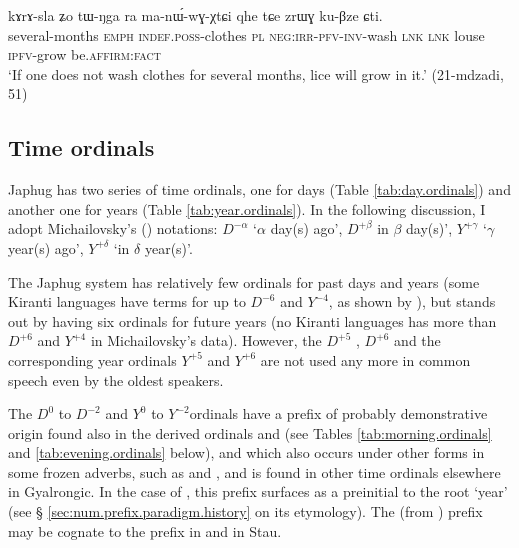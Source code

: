 \begin{exe}
\ex \label{ex:kArAsla}
\gll
kɤrɤ-sla ʑo tɯ-ŋga ra ma-nɯ́-wɣ-χtɕi qhe tɕe zrɯɣ ku-βze ɕti.  \\
several-months \textsc{emph} \textsc{indef}.\textsc{poss}-clothes \textsc{pl} \textsc{neg}:\textsc{irr}-\textsc{pfv}-\textsc{inv}-wash \textsc{lnk} \textsc{lnk} louse \textsc{ipfv}-grow be.\textsc{affirm}:\textsc{fact} \\
\glt `If one does not wash clothes for several months, lice will grow in it.' (21-mdzadi, 51)
\end{exe}


\subsection{Time ordinals} \label{sec:time.ordinals}
Japhug has two series of time ordinals, one for days (Table \ref{tab:day.ordinals}) and another one for years (Table \ref{tab:year.ordinals}).  In the following discussion, I adopt Michailovsky's (\citeyear{michailovsky03ordinals}) notations: $D^{-\alpha}$ `$\alpha$ day(s) ago', $D^{+\beta}$ in $\beta$ day(s)', $Y^{+ \gamma}$ `$\gamma$ year(s) ago', $Y^{+ \delta}$  `in $\delta$ year(s)'.

The Japhug system has relatively few ordinals for past days and years (some Kiranti languages have terms for up to $D^{-6}$ and $Y^{-4}$, as shown by \citealt{michailovsky03ordinals}), but stands out by having six ordinals for future years (no Kiranti languages has more than $D^{+6}$ and $Y^{+4}$ in Michailovsky's \citeyear{michailovsky03ordinals} data). However, the $D^{+5}$ , $D^{+6}$   and the corresponding year ordinals  $Y^{+5}$  and  $Y^{+6}$  are not used any more in common speech even by the oldest speakers.
 

The $D^{0}$ to $D^{-2}$ and $Y^{0}$ to $Y^{-2}$ordinals have a prefix of probably demonstrative origin  found also in the derived ordinals  and  (see Tables \ref{tab:morning.ordinals} and \ref{tab:evening.ordinals} below), and which also occurs under other forms in some frozen adverbs, such as  and , and is found in other time ordinals elsewhere in Gyalrongic. In the case of , this prefix surfaces as a preinitial   to the root  `year' (see § \ref{sec:num.prefix.paradigm.history} on its etymology). The  (from ) prefix may be cognate to the prefix  in  and  in Stau.

